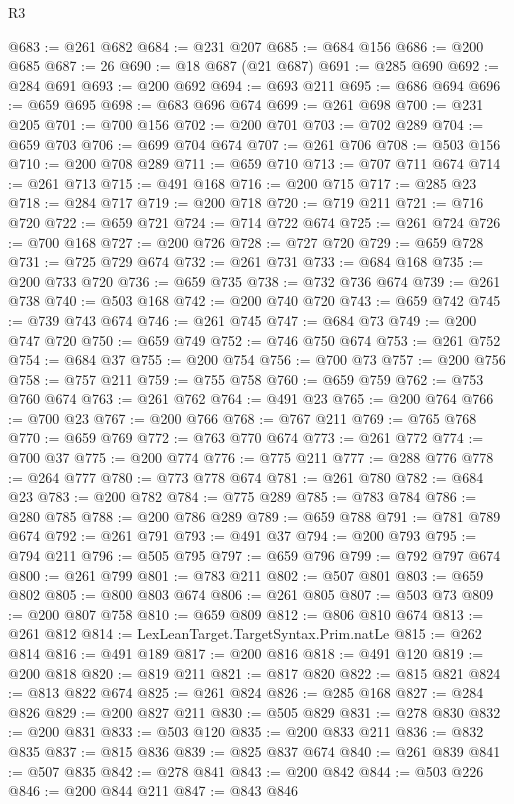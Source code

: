 \begin{lexlean}{R3}
\begin{coremodule}
@683 := @261 @682
@684 := @231 @207
@685 := @684 @156
@686 := @200 @685
@687 := 26
@690 := @18 @687 (@21 @687)
@691 := @285 @690
@692 := @284 @691
@693 := @200 @692
@694 := @693 @211
@695 := @686 @694
@696 := @659 @695
@698 := @683 @696 @674
@699 := @261 @698
@700 := @231 @205
@701 := @700 @156
@702 := @200 @701
@703 := @702 @289
@704 := @659 @703
@706 := @699 @704 @674
@707 := @261 @706
@708 := @503 @156
@710 := @200 @708 @289
@711 := @659 @710
@713 := @707 @711 @674
@714 := @261 @713
@715 := @491 @168
@716 := @200 @715
@717 := @285 @23
@718 := @284 @717
@719 := @200 @718
@720 := @719 @211
@721 := @716 @720
@722 := @659 @721
@724 := @714 @722 @674
@725 := @261 @724
@726 := @700 @168
@727 := @200 @726
@728 := @727 @720
@729 := @659 @728
@731 := @725 @729 @674
@732 := @261 @731
@733 := @684 @168
@735 := @200 @733 @720
@736 := @659 @735
@738 := @732 @736 @674
@739 := @261 @738
@740 := @503 @168
@742 := @200 @740 @720
@743 := @659 @742
@745 := @739 @743 @674
@746 := @261 @745
@747 := @684 @73
@749 := @200 @747 @720
@750 := @659 @749
@752 := @746 @750 @674
@753 := @261 @752
@754 := @684 @37
@755 := @200 @754
@756 := @700 @73
@757 := @200 @756
@758 := @757 @211
@759 := @755 @758
@760 := @659 @759
@762 := @753 @760 @674
@763 := @261 @762
@764 := @491 @23
@765 := @200 @764
@766 := @700 @23
@767 := @200 @766
@768 := @767 @211
@769 := @765 @768
@770 := @659 @769
@772 := @763 @770 @674
@773 := @261 @772
@774 := @700 @37
@775 := @200 @774
@776 := @775 @211
@777 := @288 @776
@778 := @264 @777
@780 := @773 @778 @674
@781 := @261 @780
@782 := @684 @23
@783 := @200 @782
@784 := @775 @289
@785 := @783 @784
@786 := @280 @785
@788 := @200 @786 @289
@789 := @659 @788
@791 := @781 @789 @674
@792 := @261 @791
@793 := @491 @37
@794 := @200 @793
@795 := @794 @211
@796 := @505 @795
@797 := @659 @796
@799 := @792 @797 @674
@800 := @261 @799
@801 := @783 @211
@802 := @507 @801
@803 := @659 @802
@805 := @800 @803 @674
@806 := @261 @805
@807 := @503 @73
@809 := @200 @807 @758
@810 := @659 @809
@812 := @806 @810 @674
@813 := @261 @812
@814 := LexLeanTarget.TargetSyntax.Prim.natLe
@815 := @262 @814
@816 := @491 @189
@817 := @200 @816
@818 := @491 @120
@819 := @200 @818
@820 := @819 @211
@821 := @817 @820
@822 := @815 @821
@824 := @813 @822 @674
@825 := @261 @824
@826 := @285 @168
@827 := @284 @826
@829 := @200 @827 @211
@830 := @505 @829
@831 := @278 @830
@832 := @200 @831
@833 := @503 @120
@835 := @200 @833 @211
@836 := @832 @835
@837 := @815 @836
@839 := @825 @837 @674
@840 := @261 @839
@841 := @507 @835
@842 := @278 @841
@843 := @200 @842
@844 := @503 @226
@846 := @200 @844 @211
@847 := @843 @846

\end{coremodule}
\end{lexlean}
